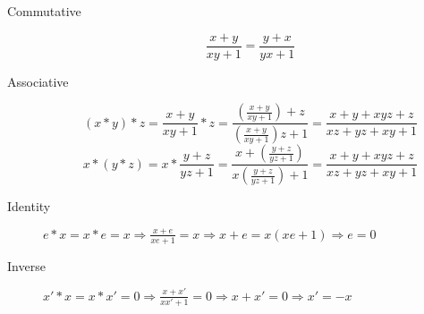 \begin{enumerate}
    \begin{description}
        \item [Commutative]
            $$\frac{x + y}{xy + 1} = \frac{y + x}{yx + 1}$$
        \item [Associative]
            $$(x * y) * z = \frac{x + y}{xy + 1} * z = \frac{\left(\frac{x + y}{xy + 1}\right) + z}{\left(\frac{x + y}{xy + 1}\right)z + 1} = \frac{x + y + xyz + z}{xz + yz + xy + 1}$$
            $$x * (y * z) = x * \frac{y + z}{yz + 1} = \frac{x + \left(\frac{y + z}{yz + 1}\right)}{x\left(\frac{y + z}{yz + 1}\right) + 1} = \frac{x + y + xyz + z}{xz + yz + xy + 1}$$
        \item [Identity] $e * x = x * e = x \Rightarrow \frac{x + e}{xe + 1} = x \Rightarrow x + e = x(xe + 1) \Rightarrow e = 0$
        \item [Inverse] $x' * x = x * x' = 0 \Rightarrow \frac{x + x'}{xx' + 1} = 0 \Rightarrow x + x' = 0 \Rightarrow x' = -x$
    \end{description}
\end{enumerate}

